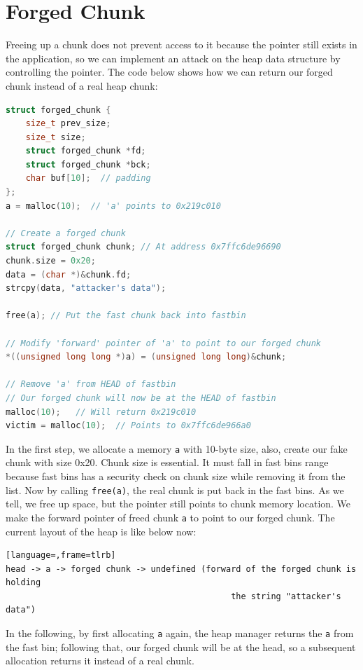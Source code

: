\documentclass{masterthesis}
\newcommand*\fb{fast bins}
\begin{document}
\section{Forged Chunk}
\label{sect:forgedchunk}
Freeing up a chunk does not prevent access to it because the pointer still exists in the application, so we can implement an attack on the heap data structure by controlling the pointer. The code below shows how we can return our forged chunk instead of a real heap chunk:

\begin{lstlisting}[language=c,frame=tlrb]
struct forged_chunk {
	size_t prev_size;
	size_t size;
	struct forged_chunk *fd;
	struct forged_chunk *bck;
	char buf[10];  // padding
};
a = malloc(10);  // 'a' points to 0x219c010

// Create a forged chunk
struct forged_chunk chunk; // At address 0x7ffc6de96690
chunk.size = 0x20;
data = (char *)&chunk.fd;
strcpy(data, "attacker's data");

free(a); // Put the fast chunk back into fastbin

// Modify 'forward' pointer of 'a' to point to our forged chunk
*((unsigned long long *)a) = (unsigned long long)&chunk;

// Remove 'a' from HEAD of fastbin
// Our forged chunk will now be at the HEAD of fastbin
malloc(10);   // Will return 0x219c010
victim = malloc(10);  // Points to 0x7ffc6de966a0
\end{lstlisting}

In the first step, we allocate a memory \lstinline{a} with 10-byte size, also, create our fake chunk with size 0x20. Chunk size is essential. It must fall in \fb{} range because \fb{} has a security check on chunk size while removing it from the list.
Now by calling \lstinline{free(a)}, the real chunk is put back in the \fb{}. As we tell, we free up space, but the pointer still points to chunk memory location. We make the forward pointer of freed chunk \lstinline{a} to point to our forged chunk. The current layout of the heap is like below now:

\begin{lstlisting}[language=,frame=tlrb]
head -> a -> forged chunk -> undefined (forward of the forged chunk is holding
                                             the string "attacker's data")
\end{lstlisting}

In the following, by first allocating \lstinline{a} again, the heap manager returns the \lstinline{a} from the fast bin; following that, our forged chunk will be at the head, so a subsequent allocation returns it instead of a real chunk.
\end{document}
